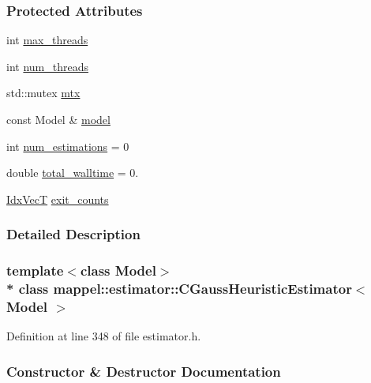 \subsubsection*{Protected Attributes}
\begin{DoxyCompactItemize}
\item 
int \hyperlink{classmappel_1_1estimator_1_1ThreadedEstimator_ab4c55ecff71dff47c0584ce20fe7f077}{max\+\_\+threads}
\item 
int \hyperlink{classmappel_1_1estimator_1_1ThreadedEstimator_af746a83929a7217b4084d0e10f850bc3}{num\+\_\+threads}
\item 
std\+::mutex \hyperlink{classmappel_1_1estimator_1_1ThreadedEstimator_af78695378590ff8e822dffe2b1b3f242}{mtx}
\item 
const Model \& \hyperlink{classmappel_1_1estimator_1_1Estimator_a2f157410771fb79a20d4d54e505750d0}{model}
\item 
int \hyperlink{classmappel_1_1estimator_1_1Estimator_a9f5390f0ac3ee127ddcd90dc6f4fd889}{num\+\_\+estimations} = 0
\item 
double \hyperlink{classmappel_1_1estimator_1_1Estimator_a98ad459e850aeb2c42c10fd06c3b9fbc}{total\+\_\+walltime} = 0.
\item 
\hyperlink{namespacemappel_ac63743dcd42180127307cd0e4ecdd784}{Idx\+VecT} \hyperlink{classmappel_1_1estimator_1_1Estimator_aa946d9789a1299d684f83a822a10caa7}{exit\+\_\+counts}
\end{DoxyCompactItemize}


\subsubsection{Detailed Description}
\subsubsection*{template$<$class Model$>$\\*
class mappel\+::estimator\+::\+C\+Gauss\+Heuristic\+Estimator$<$ Model $>$}



Definition at line 348 of file estimator.\+h.



\subsubsection{Constructor \& Destructor Documentation}
